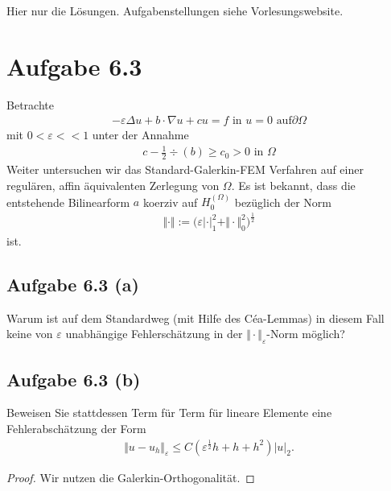 \documentclass[12pt,a4paper]{article}
\author{Willi Sontopski}
\begin{document}

Hier nur die Lösungen. Aufgabenstellungen siehe Vorlesungswebsite.

\section*{Aufgabe 6.3}
Betrachte
\begin{align*}
	-\varepsilon\Delta u+b\cdot\nabla u+cu=f\text{ in }u=0\text{ auf}\partial\Omega
\end{align*}
mit $0<\varepsilon<<1$ unter der Annahme
\begin{align*}
	c-\frac{1}{2}\div(b)\geq c_0>0\text{ in }\Omega
\end{align*}
Weiter untersuchen wir das Standard-Galerkin-FEM Verfahren auf einer regulären, affin äquivalenten Zerlegung von $\Omega$. 
Es ist bekannt, dass die entstehende Bilinearform $a$ koerziv auf $H_0^(\Omega)$ bezüglich der Norm
\begin{align*}
	\Vert\cdot\Vert:=\big(\varepsilon|\cdot|_1^2+\Vert\cdot\Vert_0^2\big)^{\frac{1}{2}}
\end{align*}
ist.
\subsection*{Aufgabe 6.3 (a)}
Warum ist auf dem Standardweg (mit Hilfe des Céa-Lemmas) in diesem Fall keine von $\varepsilon$ unabhängige Fehlerschätzung in der $\Vert\cdot\Vert_\varepsilon$-Norm möglich?

\begin{lösung}
\end{lösung}

\subsection*{Aufgabe 6.3 (b)}
Beweisen Sie stattdessen Term für Term für lineare Elemente eine Fehlerabschätzung der Form
\begin{align*}
	\Vert u-u_h\Vert_\varepsilon\leq C\left(\varepsilon^{\frac{1}{2}}h+h+h^2\right)|u|_2.
\end{align*}

\begin{proof}
	Wir nutzen die Galerkin-Orthogonalität.
\end{proof}
\end{document}
